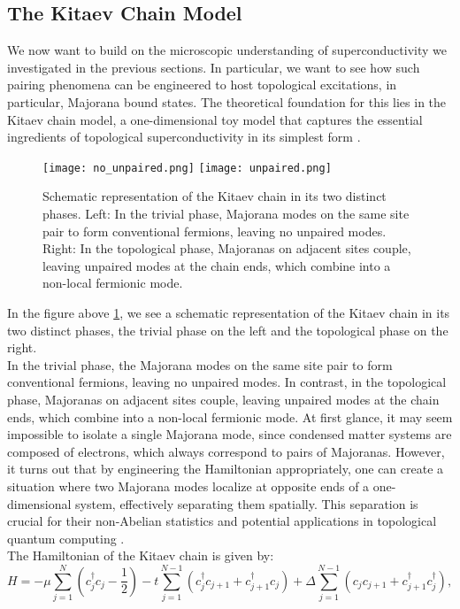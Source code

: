 \documentclass[11pt, letterpaper, titlepage]{article}
\begin{document}
\subsection{The Kitaev Chain Model}
We now want to build on the microscopic understanding of superconductivity we investigated in the previous sections. In particular, we want to see how such pairing phenomena can be engineered to host topological excitations, in particular, Majorana bound states. The theoretical foundation for this lies in the Kitaev chain model, a one-dimensional toy model that captures the essential ingredients of topological superconductivity in its simplest form \cite{Topocondmat}.\\
\begin{figure}
  \centering
  \texttt{[image: no\_unpaired.png]}
  \texttt{[image: unpaired.png]}
  \caption{Schematic representation of the Kitaev chain in its two distinct phases. Left: In the trivial phase, Majorana modes on the same site pair to form conventional fermions, leaving no unpaired modes. Right: In the topological phase, Majoranas on adjacent sites couple, leaving unpaired modes at the chain ends, which combine into a non-local fermionic mode. \cite{Topocondmat}}
  \label{fig:kitaev}
\end{figure}
In the figure above \ref{fig:kitaev}, we see a schematic representation of the Kitaev chain in its two distinct phases, the trivial phase on the left and the topological phase on the right.\\
In the trivial phase, the Majorana modes on the same site pair to form conventional fermions, leaving no unpaired modes. In contrast, in the topological phase, Majoranas on adjacent sites couple, leaving unpaired modes at the chain ends, which combine into a non-local fermionic mode. At first glance, it may seem impossible to isolate a single Majorana mode, since condensed matter systems are composed of electrons, which always correspond to pairs of Majoranas. However, it turns out that by engineering the Hamiltonian appropriately, one can create a situation where two Majorana modes localize at opposite ends of a one-dimensional system, effectively separating them spatially. This separation is crucial for their non-Abelian statistics and potential applications in topological quantum computing \cite{Topocondmat}.\\
The Hamiltonian of the Kitaev chain is given by:
\begin{equation}
H = -\mu \sum_{j=1}^{N} \left(c_j^\dagger c_j - \frac{1}{2}\right)
- t \sum_{j=1}^{N-1} \left(c_j^\dagger c_{j+1} + c_{j+1}^\dagger c_j\right)
+ \Delta \sum_{j=1}^{N-1} \left(c_j c_{j+1} + c_{j+1}^\dagger c_j^\dagger\right),
\label{eq:kitaev_ham}
\end{equation}
\end{document}
